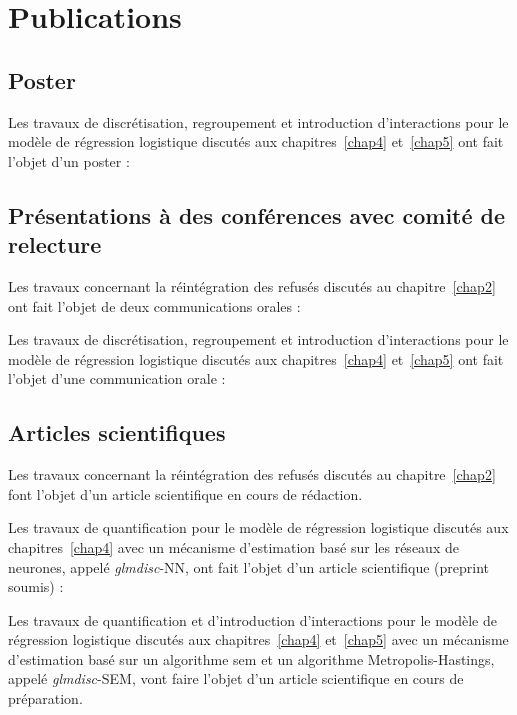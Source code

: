 \chapter{Publications}

\section{Poster}

Les travaux de discrétisation, regroupement et introduction d'interactions pour le modèle de régression logistique discutés aux chapitres~\ref{chap4} et~\ref{chap5} ont fait l'objet d'un poster :





\section{Présentations à des conférences avec comité de relecture}

Les travaux concernant la réintégration des refusés discutés au chapitre~\ref{chap2} ont fait l'objet de deux communications orales :



Les travaux de discrétisation, regroupement et introduction d'interactions pour le modèle de régression logistique discutés aux chapitres~\ref{chap4} et~\ref{chap5} ont fait l'objet d'une communication orale :


\section{Articles scientifiques}

Les travaux concernant la réintégration des refusés discutés au chapitre~\ref{chap2} font l'objet d'un article scientifique en cours de rédaction.


Les travaux de quantification pour le modèle de régression logistique discutés aux chapitres~\ref{chap4} avec un mécanisme d'estimation basé sur les réseaux de neurones, appelé \textit{glmdisc}-NN, ont fait l'objet d'un article scientifique (preprint soumis) :


Les travaux de quantification et d'introduction d'interactions pour le modèle de régression logistique discutés aux chapitres~\ref{chap4} et~\ref{chap5} avec un mécanisme d'estimation basé sur un algorithme \gls{sem} et un algorithme Metropolis-Hastings, appelé \textit{glmdisc}-SEM, vont faire l'objet d'un article scientifique en cours de préparation.

